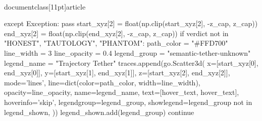 \\documentclass[11pt]{article}
\begin{document}
\begin{CodeBlock}
{{                except Exception:
                    pass
            start_xyz[2] = float(np.clip(start_xyz[2], -z_cap, z_cap))
            end_xyz[2] = float(np.clip(end_xyz[2], -z_cap, z_cap))
            if verdict not in {"HONEST", "TAUTOLOGY", "PHANTOM"}:
                path_color = "#FFD700"
                line_width = 3
                line_opacity = 0.4
                legend_group = "semantic-tether-unknown"
                legend_name = "Trajectory Tether"
                traces.append(go.Scatter3d(
                    x=[start_xyz[0], end_xyz[0]],
                    y=[start_xyz[1], end_xyz[1]],
                    z=[start_xyz[2], end_xyz[2]],
                    mode='lines',
                    line=dict(color=path_color, width=line_width),
                    opacity=line_opacity,
                    name=legend_name,
                    text=[hover_text, hover_text],
                    hoverinfo='skip',
                    legendgroup=legend_group,
                    showlegend=legend_group not in legend_shown,
                ))
                legend_shown.add(legend_group)
                continue

}}
\end{CodeBlock}
\end{document}
